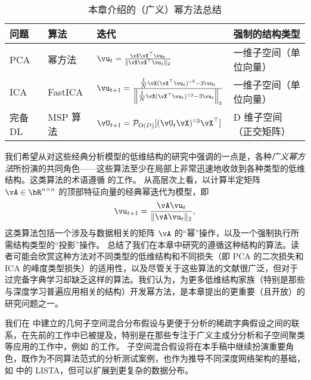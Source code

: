 \documentclass[../../book-main.tex]{subfiles}
\begin{document}
\begin{table}[tb]
\centering
    \caption{本章介绍的（广义）幂方法总结}
    \label{tab:power-method-summary}
\begin{tabular}{llll}
\toprule
问题 & 算法 & 迭代 & 强制的结构类型 \\
\midrule
PCA & 幂方法 & $\vu_{t} = \frac{\vX\vX^\top
    \vu_{t}}{\norm{\vX\vX^\top \vu_{t}}_2}$ & 一维子空间（单位向量） \\
    \addlinespace
    ICA & FastICA &
    $\vu_{t+1} = \frac{\tfrac{1}{N}\vX (\vX^\top \vu_{t})^{\hada 3}-
    3 \vu_{t}}{\norm*{\tfrac{1}{N}\vX (\vX^\top \vu_{t})^{\hada 3}-
    3 \vu_{t}}_2}$
    & 一维子空间（单位向量） \\
    \addlinespace
    完备 DL & MSP 算法 &
    $\vU_{t+1} = \mathcal{P}_{\mathrm O(D)}[( {\vU_t \vX})^{\hada 3}\vX^\top]$
    & D 维子空间（正交矩阵） \\
\bottomrule
\end{tabular}
\end{table}

我们希望从对这些经典分析模型的低维结构的研究中强调的一点是，各种\textit{广义幂方法}所扮演的共同角色——这些算法至少在局部上非常迅速地收敛到各种类型的低维结构。这类算法的术语遵循 \textcite{JourneeM2010} 的工作。
从高层次上看，以计算半定矩阵 $\vA \in \bR^{n \times n}$ 的顶部特征向量的经典幂迭代为模型，即
\begin{equation}
    \vu_{t+1} = \frac{\vA \vu_{t}}{\norm{\vA \vu_{t}}_2},
\end{equation}
这类算法包括一个涉及与数据相关的矩阵 $\vA$ 的“幂”操作，以及一个强制执行所需结构类型的“投影”操作。 总结了我们在本章中研究的遵循这种结构的算法。读者可能会欣赏这种方法对不同类型的低维结构和不同损失（即 PCA 的二次损失和 ICA 的峰度类型损失）的适用性，以及尽管关于这些算法的文献很广泛，但对于过完备字典学习却缺乏这样的算法。我们认为，为更多低维结构家族（特别是那些与深度学习普遍应用相关的结构）开发幂方法，是本章提出的更重要（且开放）的研究问题之一。


我们在  中建立的几何子空间混合分布假设与更便于分析的稀疏字典假设之间的联系，在先前的工作中已被提及，特别是在那些专注于广义主成分分析和子空间聚类等应用的工作中，例如 \textcite{GPCA} 的工作。
子空间混合假设将在本手稿中继续扮演重要角色，既作为不同算法范式的分析测试案例，也作为推导不同深度网络架构的基础，如  中的 LISTA，但可以扩展到更复杂的数据分布。
\end{document}
